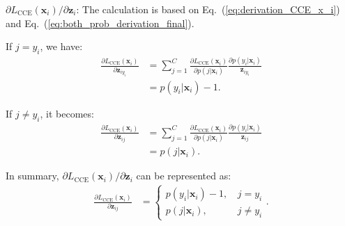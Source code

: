 \documentclass{article}
\begin{document}
\noindent
{$\partial L_{\mathrm{CCE}}(\mathbf{x}_i)/ \partial \mathbf{z}_{i}$}: The calculation is based on Eq.~(\ref{eq:derivation_CCE_x_i}) and Eq.~(\ref{eq:both_prob_derivation_final}).

\noindent
If $j = y_i$, we have:
\begin{equation}
\begin{aligned}
\frac{\partial L_{\mathrm{CCE}}(\mathbf{x}_i)}{\partial \mathbf{z}_{iy_i}} 
&= \sum_{j=1}^{C}  \frac{\partial L_{\mathrm{CCE}}(\mathbf{x}_i)}{\partial p(j|\mathbf{x}_i)}  \frac{\partial p(y_i|\mathbf{x}_i)}{\mathbf{z}_{iy_i}} \\
&=p(y_i|\mathbf{x}_i)-1
.
\end{aligned}
\end{equation}

\noindent
If $j \neq y_i$, it becomes:
\begin{equation}
\begin{aligned}
\frac{\partial L_{\mathrm{CCE}}(\mathbf{x}_i)}{\partial \mathbf{z}_{ij}} 
&= \sum_{j=1}^{C}  \frac{\partial L_{\mathrm{CCE}}(\mathbf{x}_i)}{\partial p(j|\mathbf{x}_i)}  \frac{\partial p(y_i|\mathbf{x}_i)}{\mathbf{z}_{ij}} \\
&=p(j|\mathbf{x}_i)
.
\end{aligned}
\end{equation}

\noindent
{In summary}, $\partial L_{\mathrm{CCE}}(\mathbf{x}_i)/ \partial \mathbf{z}_{i}$ can be represented as:
\begin{equation}
\label{eq:summary_CCE_z}
\begin{aligned}
\frac{\partial L_{\mathrm{CCE}}(\mathbf{x}_i)}{\partial \mathbf{z}_{ij}} 
&=
\begin{cases} 
p(y_i|\mathbf{x}_i)-1  \text{, } &j = y_i  \\
p(j|\mathbf{x}_i)        \text{, } &j \neq y_i
\end{cases}
.
\end{aligned}
\end{equation}
\end{document}
